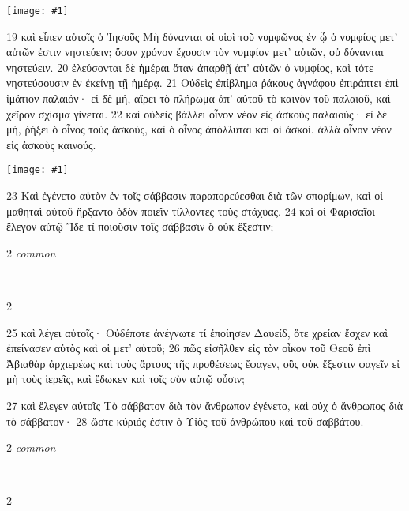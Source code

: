 \documentclass[10pt,a5paper,twoside,twocolumn]{book}
\newcommand{\fig}[1]{\texttt{[image: \#1]}\label{fig:#1}}
\newcommand*\cleartoleftpage{%
  \ifodd\value{page}\hbox{}\clearpage\fi
}
\newcommand{\separator}{\hspace{0.27\textwidth}\noindent\makebox[\linewidth]{\resizebox{0.3333\linewidth}{1pt}{$\bullet$}}\bigskip}
\newenvironment{facing}{\cleartoleftpage}{\clearpage\pagebreak}
\newenvironment{help}{\pagebreak}{}
\newenvironment{helpsec}{\begin{minipage}[t]{\textwidth}\begin{multicols}{2}}{\end{multicols}\end{minipage}}
\newenvironment{vocab}{\begin{helpsec}}{\end{helpsec}}
\newenvironment{translation}{\separator\\\begin{helpsec}\footnotesize}{\end{helpsec}}
\begin{document}
\fig{02-19} %

19 καὶ εἶπεν αὐτοῖς ὁ Ἰησοῦς Μὴ δύνανται οἱ υἱοὶ τοῦ νυμφῶνος ἐν ᾧ ὁ νυμφίος μετ’ αὐτῶν ἐστιν νηστεύειν; ὅσον χρόνον ἔχουσιν τὸν νυμφίον μετ’ αὐτῶν, οὐ δύνανται νηστεύειν. 20 ἐλεύσονται δὲ ἡμέραι ὅταν ἀπαρθῇ ἀπ’ αὐτῶν ὁ νυμφίος, καὶ τότε νηστεύσουσιν ἐν ἐκείνῃ τῇ ἡμέρᾳ. 21 Οὐδεὶς ἐπίβλημα ῥάκους ἀγνάφου ἐπιράπτει ἐπὶ ἱμάτιον παλαιόν· εἰ δὲ μή, αἴρει τὸ πλήρωμα ἀπ’ αὐτοῦ τὸ καινὸν τοῦ παλαιοῦ, καὶ χεῖρον σχίσμα γίνεται. 22 καὶ οὐδεὶς βάλλει οἶνον νέον εἰς ἀσκοὺς παλαιούς· εἰ δὲ μή, ῥήξει ὁ οἶνος τοὺς ἀσκούς, καὶ ὁ οἶνος ἀπόλλυται καὶ οἱ ἀσκοί. ἀλλὰ οἶνον νέον εἰς ἀσκοὺς καινούς.

\fig{02-23} %

	23 Καὶ ἐγένετο αὐτὸν ἐν τοῖς σάββασιν παραπορεύεσθαι διὰ τῶν σπορίμων, καὶ οἱ μαθηταὶ αὐτοῦ ἤρξαντο ὁδὸν ποιεῖν τίλλοντες τοὺς στάχυας. 24 καὶ οἱ Φαρισαῖοι ἔλεγον αὐτῷ Ἴδε τί ποιοῦσιν τοῖς σάββασιν ὃ οὐκ ἔξεστιν; 



\begin{facing}
\begin{help}
\begin{vocab}
\emph{common}\\

\end{vocab}
\begin{translation}

\end{translation}
\end{help}
\end{facing}


\begin{facing}
25 καὶ λέγει αὐτοῖς· Οὐδέποτε ἀνέγνωτε τί ἐποίησεν Δαυείδ, ὅτε χρείαν ἔσχεν καὶ ἐπείνασεν αὐτὸς καὶ οἱ μετ’ αὐτοῦ; 26 πῶς εἰσῆλθεν εἰς τὸν οἶκον τοῦ Θεοῦ ἐπὶ Ἀβιαθὰρ ἀρχιερέως καὶ τοὺς ἄρτους τῆς προθέσεως ἔφαγεν, οὓς οὐκ ἔξεστιν φαγεῖν εἰ μὴ τοὺς ἱερεῖς, καὶ ἔδωκεν καὶ τοῖς σὺν αὐτῷ οὖσιν; 

27 καὶ ἔλεγεν αὐτοῖς Τὸ σάββατον διὰ τὸν ἄνθρωπον ἐγένετο, καὶ οὐχ ὁ ἄνθρωπος διὰ τὸ σάββατον· 28 ὥστε κύριός ἐστιν ὁ Υἱὸς τοῦ ἀνθρώπου καὶ τοῦ σαββάτου.

\begin{help}
\begin{vocab}
\emph{common}\\

\end{vocab}
\begin{translation}

\end{translation}
\end{help}
\end{facing}


\sloppypar
\end{document}
